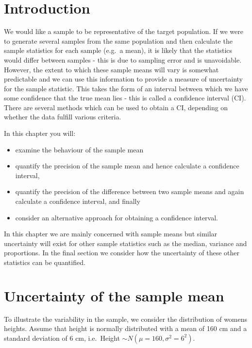 \documentclass[
  oneside]{krantz}
\providecommand{\tightlist}{%
  \setlength{\itemsep}{0pt}\setlength{\parskip}{0pt}}
\begin{document}
\hypertarget{INTci}{%
\section{Introduction}\label{INTci}}

We would like a sample to be representative of the target population. If we were to generate several samples from the same population and then calculate the sample statistics for each sample (e.g.~a mean), it is likely that the statistics would differ between samples - this is due to sampling error and is unavoidable. However, the extent to which these sample means will vary is somewhat predictable and we can use this information to provide a measure of uncertainty for the sample statistic. This takes the form of an interval between which we have some confidence that the true mean lies - this is called a confidence interval (CI). There are several methods which can be used to obtain a CI, depending on whether the data fulfill various criteria.

In this chapter you will:

\begin{itemize}
\tightlist
\item
  examine the behaviour of the sample mean
\item
  quantify the precision of the sample mean and hence calculate a confidence interval,
\item
  quantify the precision of the difference between two sample means and again calculate a confidence interval, and finally
\item
  consider an alternative approach for obtaining a confidence interval.
\end{itemize}

In this chapter we are mainly concerned with sample means but similar uncertainty will exist for other sample statistics such as the median, variance and proportions. In the final section we consider how the uncertainty of these other statistics can be quantified.

\hypertarget{uncertainty-of-the-sample-mean}{%
\section{Uncertainty of the sample mean}\label{uncertainty-of-the-sample-mean}}

To illustrate the variability in the sample, we consider the distribution of womens heights. Assume that height is normally distributed with a mean of 160 cm and a standard deviation of 6 cm, i.e.~Height \(\sim N(\mu=160, \sigma^2=6^2)\).
\end{document}
